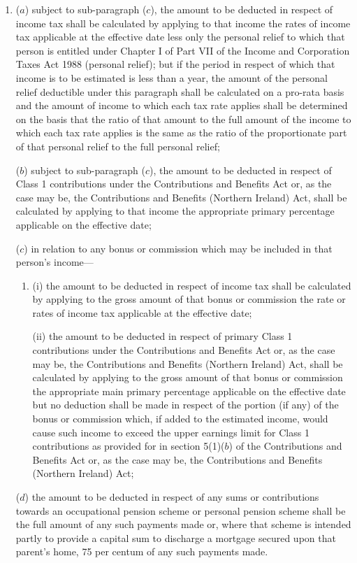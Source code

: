 \documentclass[12pt,a4paper]{article}
\begin{document}
\begin{enumerate}\item[]
($a$) subject to sub-paragraph ($c$), the amount to be deducted in respect of income tax shall be calculated by applying to that income the rates of income tax applicable at the effective date less only the personal relief to which that person is entitled under Chapter I of Part VII of the Income and Corporation Taxes Act 1988 (personal relief); but if the period in respect of which that income is to be estimated is less than a year, the amount of the personal relief deductible under this paragraph shall be calculated on a pro-rata basis and the amount of income to which each tax rate applies shall be determined on the basis that the ratio of that amount to the full amount of the income to which each tax rate applies is the same as the ratio of the proportionate part of that personal relief to the full personal relief;

($b$) subject to sub-paragraph ($c$), the amount to be deducted in respect of Class 1 contributions under the Contributions and Benefits Act or, as the case may be, the Contributions and Benefits (Northern Ireland) Act, shall be calculated by applying to that income the appropriate primary percentage applicable on the effective date;

($c$) in relation to any bonus or commission which may be included in that person’s income—
\begin{enumerate}\item[]
(i) the amount to be deducted in respect of income tax shall be calculated by applying to the gross amount of that bonus or commission the rate or rates of income tax applicable at the effective date;

(ii) the amount to be deducted in respect of primary Class 1 contributions under the Contributions and Benefits Act or, as the case may be, the Contributions and Benefits (Northern Ireland) Act, shall be calculated by applying to the gross amount of that bonus or commission the appropriate main primary percentage applicable on the effective date but no deduction shall be made in respect of the portion (if any) of the bonus or commission which, if added to the estimated income, would cause such income to exceed the upper earnings limit for Class 1 contributions as provided for in section 5(1)($b$)  of the Contributions and Benefits Act or, as the case may be, the Contributions and Benefits (Northern Ireland) Act;
\end{enumerate}

($d$) the amount to be deducted in respect of any sums or contributions towards an occupational pension scheme or personal pension scheme shall be the full amount of any such payments made or, where that scheme is intended partly to provide a capital sum to discharge a mortgage secured upon that parent’s home, 75 per centum of any such payments made.
\end{enumerate}
\end{document}
